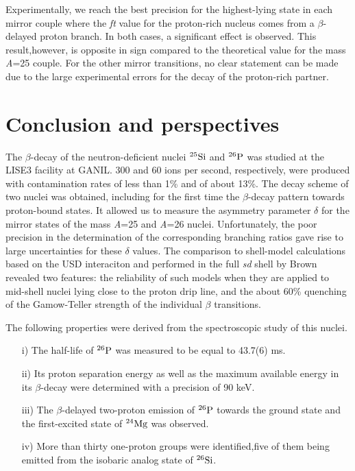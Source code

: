 \documentclass[UTF8]{ctexart}
\begin{document}
Experimentally, we reach the best precision for the highest-lying state in each mirror couple where the \textit{ft} value for the proton-rich nucleus comes from a $\beta$-delayed proton branch. In both cases, a significant effect is observed. This result,however, is opposite in sign compared to the theoretical value for the mass \textit{A}=25 couple. For the other mirror transitions, no clear statement can be made due to the large experimental errors for the decay of the proton-rich partner.
\section{Conclusion and perspectives}
The $\beta$-decay of the neutron-deficient nuclei $^{25}\textnormal{Si}$ and $^{26}\textnormal{P}$ was studied at the LISE3 facility at GANIL. 300 and 60 ions per second, respectively, were produced with contamination rates of less than 1\% and of about 13\%. The decay scheme of two nuclei was obtained, including for the first
time the $\beta$-decay pattern towards proton-bound states. It allowed us to measure the asymmetry parameter $\delta$ for the mirror states of the mass \textit{A}=25 and \textit{A}=26 nuclei. Unfortunately, the poor precision in the determination of the corresponding branching ratios gave rise to large uncertainties for these $\delta$ values. The comparison to shell-model calculations based on the USD interaciton and performed in the full \textit{sd} shell by Brown revealed two features: the reliability of such models when they are applied to mid-shell nuclei lying close to the proton drip line, and the about 60\% quenching of the Gamow-Teller strength of the individual $\beta$ transitions.

The following properties were derived from the spectroscopic study of this nuclei.
\begin{itemize}
    \item[i)] The half-life of $^{26}\textnormal{P}$ was measured to be equal to 43.7(6) ms.
    \item[ii)] Its proton separation energy as well as the maximum available energy in its $\beta$-decay were determined with a precision of 90 keV. 
    \item[iii)] The $\beta$-delayed two-proton emission of $^{26}\textnormal{P}$ towards the ground state and the first-excited state of $^{24}\textnormal{Mg}$ was observed.
    \item[iv)] More than thirty one-proton groups were identified,five of them being emitted from the isobaric analog state of $^{26}\textnormal{Si}$.    
\end{itemize}
\end{document}
